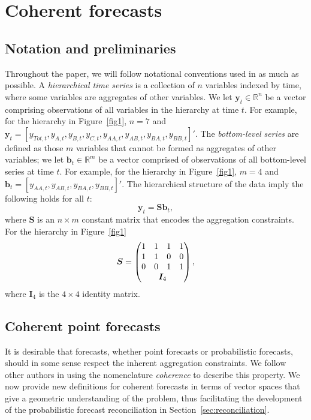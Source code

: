 \documentclass[a4paper, 11pt]{article}
\theoremstyle{definition}
\begin{document}
\section{Coherent forecasts}\label{sec:definitions}

\subsection{Notation and preliminaries}\label{sec:notation}

Throughout the paper, we will follow notational conventions used in \citet{Wickramasuriya2017} as much as possible. A \emph{hierarchical time series} is a collection of $n$ variables indexed by time, where some variables are aggregates of other variables. We let $\bm{y}_t \in \mathbb{R}^n$ be a vector comprising observations of all variables in the hierarchy at time $t$. For example, for the hierarchy in Figure~\ref{fig1}, $n=7$ and $\bm{y}_t = [y_{Tot,t},y_{A,t}, y_{B,t},y_{C,t},y_{AA,t}, y_{AB,t}, y_{BA,t}, y_{BB,t}]'$. The \emph{bottom-level series} are defined as those $m$ variables that cannot be formed as aggregates of other variables; we let $\bm{b}_t \in \mathbb{R}^m$ be a vector comprised of observations of all bottom-level series at time $t$. For example, for the hierarchy in Figure~\ref{fig1}, $m=4$ and $\bm{b}_t = [y_{AA,t}, y_{AB,t}, y_{BA,t}, y_{BB,t}]'$. The hierarchical structure of the data imply the following holds for all $t$:
\begin{equation}
  \bm{y}_t = \bm{Sb}_t,
\end{equation}
where $\bm{S}$ is an $n \times m$ constant matrix that encodes the aggregation constraints. For the hierarchy in Figure~\ref{fig1}
\[
  \bm{S} = \begin{pmatrix}
               1 & 1 & 1 & 1  \\
               1 & 1 & 0 & 0 \\
               0 & 0 & 1 & 1 \\
               & \multicolumn{2}{c}{\bm{I}_4} &
           \end{pmatrix},
\]
where $\bm{I}_4$ is the $4\times 4$ identity matrix.

\subsection{Coherent point forecasts}\label{sec:cohpointf}

It is desirable that forecasts, whether point forecasts or probabilistic forecasts, should in some sense respect the inherent aggregation constraints. We follow other authors \citep{Wickramasuriya2017, FPP2018} in using the nomenclature \emph{coherence} to describe this property.
We now provide new definitions for coherent forecasts in terms of vector spaces that give a geometric understanding of the problem, thus facilitating the development of the probabilistic forecast reconciliation in Section~\ref{sec:reconciliation}.
\end{document}

